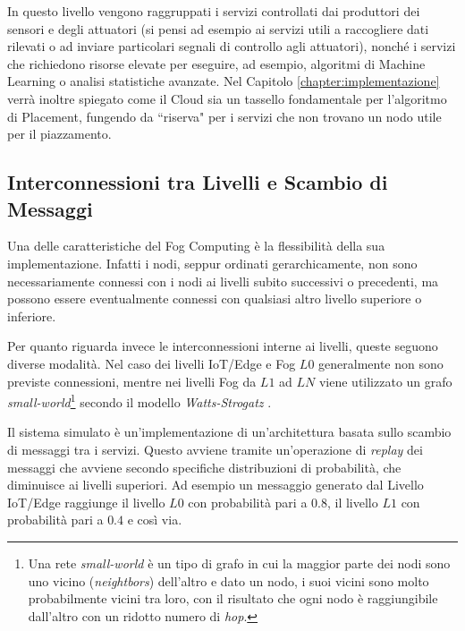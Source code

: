 In questo livello vengono raggruppati i servizi controllati dai produttori dei sensori e degli attuatori (si pensi ad esempio ai servizi utili a raccogliere dati rilevati o ad inviare particolari segnali di controllo agli attuatori), nonché i servizi che richiedono risorse elevate per eseguire, ad esempio, algoritmi di Machine Learning o analisi statistiche avanzate. Nel Capitolo \ref{chapter:implementazione} verrà inoltre spiegato come il Cloud sia un tassello fondamentale per l'algoritmo di Placement, fungendo da ``riserva" per i servizi che non trovano un nodo utile per il piazzamento.

\subsection{Interconnessioni tra Livelli e Scambio di Messaggi}
\label{section:interconnesione_livelli}
Una delle caratteristiche del Fog Computing è la flessibilità della sua implementazione. Infatti i nodi, seppur ordinati gerarchicamente, non sono necessariamente connessi con i nodi ai livelli subito successivi o precedenti, ma possono essere eventualmente connessi con qualsiasi altro livello superiore o inferiore. 

Per quanto riguarda invece le interconnessioni interne ai livelli, queste seguono diverse modalità. Nel caso dei livelli IoT/Edge e Fog $L0$ generalmente non sono previste connessioni, mentre nei livelli Fog da $L1$ ad $LN$ viene utilizzato un grafo \textit{small-world}\footnote{Una rete \textit{small-world} è un tipo di grafo in cui la maggior parte dei nodi sono uno vicino (\textit{neightbors}) dell'altro e dato un nodo, i suoi vicini sono molto probabilmente vicini tra loro, con il risultato che ogni nodo è raggiungibile dall'altro con un ridotto numero di \textit{hop}.} secondo il modello \textit{Watts-Strogatz} \cite{WattsStrogatzModel}.

Il sistema simulato è un'implementazione di un'architettura basata sullo scambio di messaggi tra i servizi. Questo avviene tramite un'operazione di \textit{replay} dei messaggi che avviene secondo specifiche distribuzioni di probabilità, che diminuisce ai livelli superiori. Ad esempio un messaggio generato dal Livello IoT/Edge raggiunge il livello $L0$ con probabilità pari a $0.8$, il livello $L1$ con probabilità pari a $0.4$ e così via.



















